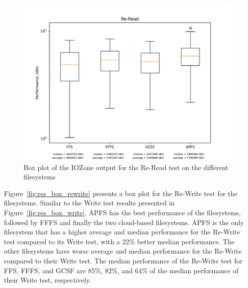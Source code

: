 \begin{figure}[!ht]
	\label{fig:res_box_reread}
	\begin{center}
		\includegraphics[width=1.0\textwidth]{figures.nosync/benchmarking/Re-Read_box.pdf}
	\end{center}
	\caption{Box plot of the IOZone output for the Re-Read test on the different filesystems}
\end{figure}

\FloatBarrier

Figure~\ref{fig:res_box_rewrite} presents a box plot for the \mbox{Re-Write} test for the filesystems. Similar to the Write test results presented in Figure~\ref{fig:res_box_write}, \gls{APFS} has the best performance of the filesystems, followed by \gls{FFFS} and finally the two cloud-based filesystems. \gls{APFS} is the only filesystem that has a higher average and median performance for the \mbox{Re-Write} test compared to its Write test, with a 22\% better median performance. The other filesystems have worse average and median performance for the \mbox{Re-Write} compared to their Write test. The median performance of the \mbox{Re-Write} test for \gls{FFS}, \gls{FFFS}, and \gls{GCSF} are 85\%, 82\%, and 64\% of the median performance of their Write test, respectively. 

